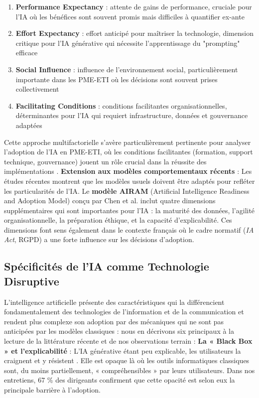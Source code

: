 \begin{enumerate}
    \item \textbf{Performance Expectancy} : attente de gains de performance, cruciale pour l'IA où les bénéfices sont souvent promis mais difficiles à quantifier ex-ante
    \item \textbf{Effort Expectancy} : effort anticipé pour maîtriser la technologie, dimension critique pour l'IA générative qui nécessite l'apprentissage du "prompting" efficace
    \item \textbf{Social Influence} : influence de l'environnement social, particulièrement importante dans les PME-ETI où les décisions sont souvent prises collectivement
    \item \textbf{Facilitating Conditions} : conditions facilitantes organisationnelles, déterminantes pour l'IA qui requiert infrastructure, données et gouvernance adaptées
\end{enumerate}
\medskip
Cette approche multifactorielle s'avère particulièrement pertinente pour analyser l'adoption de l'IA en PME-ETI, où les conditions facilitantes (formation, support technique, gouvernance) jouent un rôle crucial dans la réussite des implémentations \cite{vorecol2024resistance}.
\medskip
\textbf{Extension aux modèles comportementaux récents} : Les études récentes montrent que les modèles usuels doivent être adaptés pour refléter les particularités de l’IA.
Le \textbf{modèle AIRAM} (Artificial Intelligence Readiness and Adoption Model) conçu par Chen et al. \cite{chen2024airam} inclut quatre dimensions supplémentaires qui sont importantes pour l’IA : la maturité des données, l’agilité organisationnelle, la préparation éthique, et la capacité d’explicabilité.  
Ces dimensions font sens également dans le contexte français où le cadre normatif (\textit{IA Act}, RGPD) a une forte influence sur les décisions d’adoption.

\subsection{Spécificités de l'IA comme Technologie Disruptive}

L’intelligence artificielle présente des caractéristiques qui la différencient fondamentalement des technologies de l’information et de la communication et rendent plus complexe son adoption par des mécaniques qui ne sont pas anticipées par les modèles classiques : nous en décrivons six principaux à la lecture de la littérature récente et de nos observations terrain :
\textbf{La « Black Box » et l'explicabilité} : L'IA générative étant peu explicable, les utilisateurs la craignent et y résistent \cite{fountaine2019building}. Elle est opaque là où les outils informatiques classiques sont, du moins partiellement, « compréhensibles » par leurs utilisateurs. Dans nos entretiens, 67 \% des dirigeants confirment que cette opacité est selon eux la principale barrière à l'adoption.

